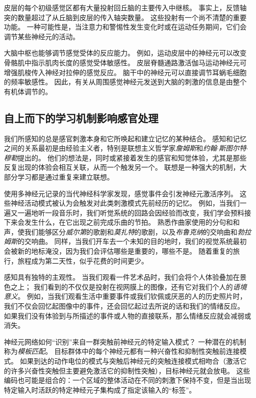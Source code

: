 皮层的每个初级感觉区都有大量投射回丘脑的主要传入中继核。
事实上，反馈轴突的数量超过了从丘脑到皮层的传入轴突数量。
这些投射有一个尚不清楚的重要功能。
一种可能性是，当注意力和警惕性发生变化时或在运动任务期间，它们会调节某些神经元的活动。


大脑中枢也能够调节感觉受体的反应能力。
例如，运动皮层中的神经元可以改变骨骼肌中指示肌肉长度的感觉受体敏感性。
皮层脊髓通路激活伽马运动神经元可增强肌梭传入神经对拉伸的感觉反应。
脑干中的神经元可以直接调节耳蜗毛细胞的频率敏感性。
因此，有关从周围感觉神经元发送到大脑的刺激的信息是由整个有机体调节的。



\subsection{自上而下的学习机制影响感官处理}

我们所感知的总是感官刺激本身和它所唤起和建立记忆的某种结合。
感知和记忆之间的关系最初是由经验主义者，特别是联想主义哲学家\textit{詹姆斯}和\textit{约翰$\cdot$斯图尔特$\cdot$穆勒}提出的。
他们的想法是，同时或紧接着发生的感官和知觉体验，尤其是那些反复出现的体验会相互关联，从而一个触发另一个。
联想是一种强大的机制，大部分学习都是通过重复来建立联想。


使用多神经元记录的当代神经科学家发现，感觉事件会引发神经元激活序列。
这些神经活动模式被认为会触发对此类刺激模式先前经历的记忆。
例如，当我们一遍又一遍地听一段音乐时，我们听觉系统的回路会因经验而改变，我们学会预料接下来会发生什么，在它出现之前完成乐曲的节拍。
熟悉作曲家使用的分句和和声，使我们能够区分\textit{威尔第}的歌剧和\textit{莫扎特}的歌剧，以及\textit{布鲁克纳}的交响曲和\textit{勃拉姆斯}的交响曲。
同样，当我们开车去一个未知的目的地时，我们的视觉系统最初会被新的地标淹没，因为我们会评估哪些是重要的，哪些不是。
随着重复的旅行，旅程成为第二天性，似乎花费的时间更少。


感知具有独特的主观性。
当我们观看一件艺术品时，我们会将个人体验叠加在景色之上；
我们看到的不仅仅是投射在视网膜上的图像，还有它对我们个人的\textit{语境意义}。
例如，当我们观看生活中重要事件或我们钦佩或厌恶的人的历史照片时，我们不仅会回忆起图像中的事件，还会回忆起过去所说的话和我们的情绪反应。
如果我们没有体验到与所描述的事件或人物的直接联系，那么情绪反应就会减弱或消失。


神经元网络如何“识别”来自一群突触前神经元的特定输入模式？
一种潜在的机制称为\textit{模板匹配}。
目标群体中的每个神经元都有一种兴奋性和抑制性突触前连接模式。
如果到达的动作电位的模式与突触后神经元的突触连接模式相吻合（激活它的许多兴奋性突触但主要避免激活它的抑制性突触），目标神经元就会放电。 
这些编码也可能是组合的：一个区域的整体活动在不同的刺激下保持不变，但是当出现特定输入时活跃的特定神经元子集构成了指定该输入的“标签”。


